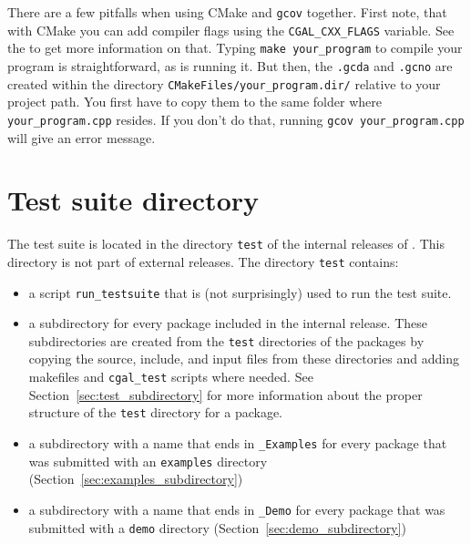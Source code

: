 There are a few pitfalls when using CMake and \texttt{gcov} together.
First note, that with CMake you can add compiler flags using the \texttt{CGAL\_CXX\_FLAGS} variable. See the
 to get more information on that. Typing \texttt{make your\_program} to compile your program is straightforward, as is running it. But then, the \texttt{.gcda}
and \texttt{.gcno} are created within the directory \texttt{CMakeFiles/your\_program.dir/} relative to your project path. You first have to copy them to the same folder where \texttt{your\_program.cpp} resides.
If you don't do that, running \texttt{gcov your\_program.cpp} will give an error
message.


\section{Test suite directory\label{sec:test_suite_directory}}

The test suite is located in the directory {\tt test} of the internal 
releases of \cgal. This directory is not part of external releases. The 
directory {\tt test} 
contains:
\begin{itemize}
   \item a script {\tt run\_testsuite}
         that is (not surprisingly) used to run the test suite.
   \item a subdirectory for every package included in the internal release.
         These subdirectories are created from the {\tt test} directories
         of the packages by copying the source, include, and input files from 
         these directories and adding makefiles and {\tt cgal\_test} scripts 
         where needed.  See Section~\ref{sec:test_subdirectory} for more
         information about the proper structure of the {\tt test} directory
         for a package.
   \item a subdirectory with a name that ends in {\tt \_Examples} for every 
         package that was submitted with an {\tt examples} directory 
         (Section~\ref{sec:examples_subdirectory})
   \item a subdirectory with a name that ends in {\tt \_Demo} for every
         package that was submitted with a {\tt demo} directory
         (Section~\ref{sec:demo_subdirectory})
\end{itemize}

